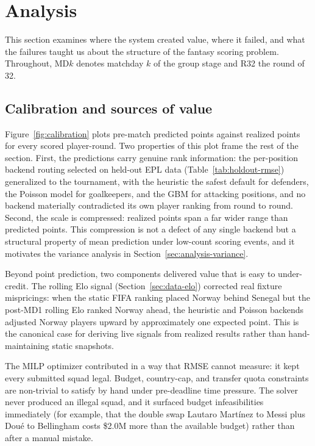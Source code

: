 \section{Analysis}
\label{sec:analysis}

This section examines where the system created value, where it failed,
and what the failures taught us about the structure of the fantasy
scoring problem. Throughout, MD$k$ denotes matchday $k$ of the group
stage and R32 the round of 32.

\subsection{Calibration and sources of value}
\label{sec:analysis-value}

Figure~\ref{fig:calibration} plots pre-match predicted points against
realized points for every scored player-round. Two properties of this
plot frame the rest of the section. First, the predictions carry
genuine rank information: the per-position backend routing selected on
held-out EPL data (Table~\ref{tab:holdout-rmse}) generalized to the
tournament, with the heuristic the safest default for defenders, the
Poisson model for goalkeepers, and the GBM for attacking positions, and
no backend materially contradicted its own player ranking from round to
round. Second, the scale is compressed: realized points span a far
wider range than predicted points. This compression is not a defect of
any single backend but a structural property of mean prediction under
low-count scoring events, and it motivates the variance analysis in
Section~\ref{sec:analysis-variance}.

Beyond point prediction, two components delivered value that is easy to
under-credit. The rolling Elo signal (Section~\ref{sec:data-elo})
corrected real fixture mispricings: when the static FIFA ranking placed
Norway behind Senegal but the post-MD1 rolling Elo ranked Norway ahead,
the heuristic and Poisson backends adjusted Norway players upward by
approximately one expected point. This is the canonical case for
deriving live signals from realized results rather than hand-maintaining
static snapshots.

The MILP optimizer contributed in a way that RMSE cannot measure: it
kept every submitted squad legal. Budget, country-cap, and transfer
quota constraints are non-trivial to satisfy by hand under pre-deadline
time pressure. The solver never produced an illegal squad, and it
surfaced budget infeasibilities immediately (for example, that the
double swap Lautaro Mart\'inez to Messi plus Dou\'e to Bellingham costs
\$2.0M more than the available budget) rather than after a manual
mistake.

